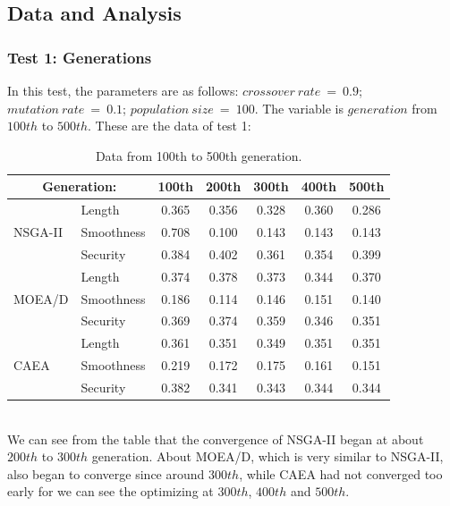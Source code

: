 \documentclass[a4paper, 11pt]{article}
\begin{document}
\subsection{Data and Analysis}

\subsubsection{Test 1: Generations}
In this test, the parameters are as follows: $crossover\ rate\ =\ 0.9$;
$mutation\ rate\ =\ 0.1$; $population\ size\ =\ 100$. The variable is $generation$ from $100th$ to $500th$. These are the data of test 1:\\
\begin{table}[!htb]
  \centering
    \begin{tabular}{|l|l|c|c|c|c|c|}
    \hline
    \multicolumn{2}{|c|}{Generation:}& 100th & 200th & 300th & 400th & 500th\\
    \hline
    \multirow{3}{*}{NSGA-II}& Length & 0.365 & 0.356 & 0.328 & 0.360 & 0.286\\
                            & Smoothness & 0.708 & 0.100 & 0.143 & 0.143 & 0.143\\
                            & Security & 0.384 & 0.402 & 0.361 & 0.354 & 0.399\\
    \hline
    \multirow{3}{*}{MOEA/D} & Length & 0.374 & 0.378 & 0.373 & 0.344 & 0.370\\
                            & Smoothness & 0.186 & 0.114 & 0.146 & 0.151 & 0.140\\
                            & Security & 0.369 & 0.374 & 0.359 & 0.346 & 0.351\\
    \hline
    \multirow{3}{*}{CAEA}   & Length & 0.361 & 0.351 & 0.349 & 0.351 & 0.351\\
                            & Smoothness & 0.219 & 0.172 & 0.175 & 0.161 & 0.151\\
                            & Security & 0.382 & 0.341 & 0.343 & 0.344 & 0.344\\
    \hline
    \end{tabular}
  \caption{Data from 100th to 500th generation.}\label{tb:15}
\end{table}
\\
We can see from the table that the convergence of NSGA-II began at about $200th$ to $300th$ generation.
About MOEA/D, which is very similar to NSGA-II, also began to converge since around $300th$, while CAEA had
not converged too early for we can see the optimizing at $300th$, $400th$ and $500th$.
\end{document}
